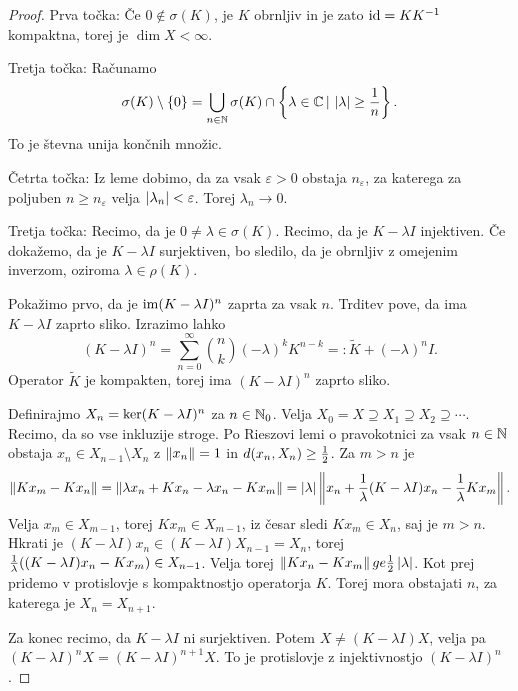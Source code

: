 \begin{proof}
  Prva točka:
  Če $0 \notin \sigma(K)$, je $K$ obrnljiv in je zato $\operatorname{id} = K K^{-1}$
  kompaktna, torej je $\dim X < \infty$.

  Tretja točka:
  Računamo
  \[
	\sigma(K) \setminus \{0\}
	= \bigcup_{n \in \mathbb{N}} \sigma(K) \cap \left\{ \lambda \in \mathbb{C} \,|\, \left| \lambda \right|
	\ge \frac{1}{n} \right\}.
  \]
  To je števna unija končnih množic.

  Četrta točka:
  Iz leme dobimo, da za vsak $\varepsilon > 0$ obstaja $n_\varepsilon$, za
  katerega za poljuben $n \ge n_\varepsilon$ velja $\left| \lambda_n \right| <
  \varepsilon$.
  Torej $\lambda_n \to 0$.

  Tretja točka:
  Recimo, da je $0 \ne \lambda \in \sigma(K)$.
  Recimo, da je $K - \lambda I$ injektiven.
  Če dokažemo, da je $K - \lambda I$ surjektiven, bo sledilo, da je obrnljiv z
  omejenim inverzom, oziroma $\lambda \in \rho(K)$.

  Pokažimo prvo, da je $\operatorname{im} (K - \lambda I)^n$ zaprta za vsak $n$.
  Trditev pove, da ima $K - \lambda I$ zaprto sliko.
  Izrazimo lahko
  \[
	(K - \lambda I)^n
	= \sum_{n=0}^\infty \binom{n}{k} (-\lambda)^k K^{n-k}
	=: \tilde{K} + (-\lambda)^n I.
  \]
  Operator $\tilde{K}$ je kompakten, torej ima $(K - \lambda I)^n$ zaprto sliko.

  Definirajmo $X_n = \operatorname{ker} (K - \lambda I)^n$ za $n \in \mathbb{N}_0$.
  Velja $X_0 = X \supseteq X_1 \supseteq X_2 \supseteq \cdots$.
  Recimo, da so vse inkluzije stroge.
  Po Rieszovi lemi o pravokotnici za vsak $n \in \mathbb{N}$ obstaja $x_n \in X_{n-1}
  \setminus X_n$ z $\left\lVert x_n\right\rVert = 1$ in $d(x_n, X_n) \ge \frac{1}{2}$.
  Za $m > n$ je
  \[
	\left\lVert K x_m - K x_n\right\rVert
	= \left\lVert\lambda x_n + K x_n - \lambda x_n - K x_m\right\rVert
	= \left| \lambda \right| \left\lVert x_n + \frac{1}{\lambda} (K - \lambda I) x_n -
	  \frac{1}{\lambda} K x_m\right\rVert.
  \]
  Velja $x_m \in X_{m-1}$, torej $K x_m \in X_{m-1}$, iz česar sledi $K x_m \in
  X_n$, saj je $m > n$.
  Hkrati je $(K - \lambda I) x_n \in (K - \lambda I) X_{n-1} =X_n$, torej
  $\frac{1}{\lambda}((K - \lambda I) x_n - K x_m) \in X_{n-1}$.
  Velja torej $\left\lVert K x_n - K x_m\right\rVert ge \frac{1}{2} \left| \lambda \right|$.
  Kot prej pridemo v protislovje s kompaktnostjo operatorja $K$.
  Torej mora obstajati $n$, za katerega je $X_n = X_{n+1}$.

  Za konec recimo, da $K - \lambda I$ ni surjektiven.
  Potem $X \ne (K - \lambda I) X$, velja pa $(K - \lambda I)^n X = (K - \lambda
  I)^{n+1} X$.
  To je protislovje z injektivnostjo $(K - \lambda I)^n$.
\end{proof}

